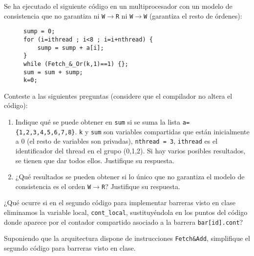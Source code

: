 \begin{ejercicio}
    Se ha ejecutado el siguiente código en un multiprocesador con un modelo de consistencia que no
    garantiza ni \verb|W|$\to$\verb|R| ni \verb|W|$\to$\verb|W| (garantiza el resto de órdenes):
    \begin{figure}[H]
        \centering
        \begin{verbatim}
sump = 0;
for (i=ithread ; i<8 ; i=i+nthread) {
    sump = sump + a[i];
}
while (Fetch_&_Or(k,1)==1) {};
sum = sum + sump;
k=0;
        \end{verbatim}
    \end{figure}
    Conteste a las siguientes preguntas (considere que el compilador no altera el código):
    \begin{enumerate}
        \item Indique qué se puede obtener en \verb|sum| si se suma la lista \verb|a={1,2,3,4,5,6,7,8}|. \verb|k| y \verb|sum| son variables
        compartidas que están inicialmente a 0 (el resto de variables son privadas), \verb|nthread = 3|, \verb|ithread| es el
        identificador del thread en el grupo (0,1,2). Si hay varios posibles resultados, se tienen que dar todos
        ellos. Justifique su respuesta.
        \item ¿Qué resultados se pueden obtener si lo único que no garantiza el modelo de consistencia es el orden
        \verb|W|$\to$\verb|R|? Justifique su respuesta.
    \end{enumerate}
\end{ejercicio}

\begin{ejercicio}
    ¿Qué ocurre si en el segundo código para implementar barreras visto en clase eliminamos la
    variable local, \verb|cont_local|, sustituyéndola en los puntos del código donde aparece por el contador
    compartido asociado a la barrera \verb|bar[id].cont|?
\end{ejercicio}

\begin{ejercicio}
    Suponiendo que la arquitectura dispone de instrucciones \verb|Fetch&Add|, simplifique el segundo
    código para barreras visto en clase.
\end{ejercicio}

